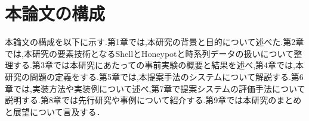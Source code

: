 \section{本論文の構成}
\label{introduction:kosei}
本論文の構成を以下に示す.第1章では,本研究の背景と目的について述べた.第2章では,本研究の要素技術となるShellとHoneypotと時系列データの扱いについて整理する.第3章では本研究にあたっての事前実験の概要と結果を述べ,第4章では,本研究の問題の定義をする.第5章では,本提案手法のシステムについて解説する.第6章では,実装方法や実装例について述べ,第7章で提案システムの評価手法について説明する.第8章では先行研究や事例について紹介する.第9章では本研究のまとめと展望について言及する．



